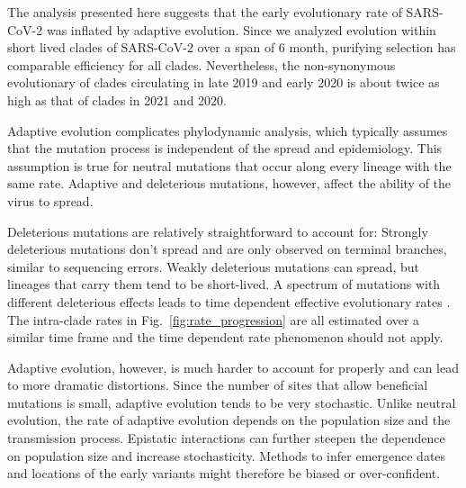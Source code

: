 \documentclass[aps,rmp, twocolumn]{revtex4}
\begin{document}
The analysis presented here suggests that the early evolutionary rate of SARS-CoV-2 was inflated by adaptive evolution.
Since we analyzed evolution within short lived clades of SARS-CoV-2 over a span of 6 month, purifying selection has comparable efficiency for all clades.
Nevertheless, the non-synonymous evolutionary of clades circulating in late 2019 and early 2020 is about twice as high as that of clades in 2021 and 2020.

Adaptive evolution complicates phylodynamic analysis, which typically assumes that the mutation process is independent of the spread and epidemiology.
This assumption is true for neutral mutations that occur along every lineage with the same rate.
Adaptive and deleterious mutations, however, affect the ability of the virus to spread.

Deleterious mutations are relatively straightforward to account for: Strongly deleterious mutations don't spread and are only observed on terminal branches, similar to sequencing errors.
Weakly deleterious mutations can spread, but lineages that carry them tend to be short-lived.
A spectrum of mutations with different deleterious effects leads to time dependent effective evolutionary rates \citep{wertheim_purifying_2011}.
The intra-clade rates in Fig.~\ref{fig:rate_progression} are all estimated over a similar time frame and the time dependent rate phenomenon should not apply.

Adaptive evolution, however, is much harder to account for properly and can lead to more dramatic distortions.
Since the number of sites that allow beneficial mutations is small, adaptive evolution tends to be very stochastic.
Unlike neutral evolution, the rate of adaptive evolution depends on the population size and the transmission process.
Epistatic interactions can further steepen the dependence on population size and increase stochasticity.
Methods to infer emergence dates and locations of the early variants might therefore be biased or over-confident.





\appendix


\end{document}
